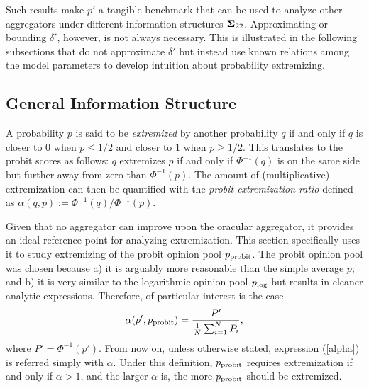 \documentclass[12pt]{article}
\theoremstyle{definition}
\theoremstyle{definition}
\def\probit{p_{\rm probit}}
\def\plog{p_{\rm log}}
\begin{document}
Such results make $p'$ a tangible benchmark that can be used to analyze other aggregators under different information structures ${\bf\Sigma}_{22}$. Approximating or bounding $\delta'$, however, is not always necessary. This is illustrated in the following subsections that do not approximate $\delta'$ but instead use known relations among the model parameters to develop intuition about probability extremizing. 

\subsection{General Information Structure}

A probability $p$ is said to be \textit{extremized} by another probability $q$ if and only
if $q$ is closer to $0$ when $p \leq 1/2$ and closer to $1$ when $p
\geq 1/2$. This translates to the probit scores as follows: $q$ extremizes $p$ if and only if  $\Phi^{-1}(q)$ is on the same side but further away from zero than $\Phi^{-1}(p)$. The amount of (multiplicative) extremization can then be quantified with the {\em probit extremization ratio} defined as 
 $\alpha(q,p) := \Phi^{-1}(q) / \Phi^{-1} (p)$. 
 
 
 Given that no aggregator can improve upon the oracular aggregator, it provides an ideal
reference point for analyzing extremization. This section specifically uses it to study
extremizing of the probit opinion pool $\probit$. The probit opinion 
pool was chosen because a) it is arguably more
reasonable than the simple average $\bar{p}$; and b) it is very
similar to the logarithmic opinion pool $\plog$ but results in cleaner
analytic expressions. Therefore, of particular interest is the case
\begin{align}
\alpha(p', \probit)  = \frac{P'}{\frac{1}{N}\sum_{i=1}^N P_{i}}, \label{alpha}
\end{align}
where $P' = \Phi^{-1}(p')$. From now on, unless otherwise stated, expression (\ref{alpha}) is referred simply with
$\alpha$. 
Under this definition, $\probit$
requires extremization if and only if $\alpha > 1$, and the larger $\alpha$ is, the more $\probit$ should be extremized. 
\end{document}
